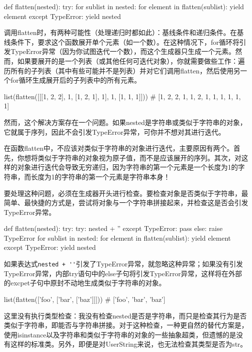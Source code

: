 \begin{pyc}
def flatten(nested):
    try:
        for sublist in nested:
            for element in flatten(sublist):
                yield element
    except TypeError:
        yield nested
\end{pyc}

调用flatten时，有两种可能性（处理递归时都如此）：基线条件和递归条件。在基线条件下，要求这个函数展开单个元素（如一个数）。在这种情况下，for循环将引发TypeError异常（因为你试图迭代一个数），而这个生成器只生成一个元素。然而，如果要展开的是一个列表（或其他任何可迭代对象），你就需要做些工作：遍历所有的子列表（其中有些可能并不是列表）并对它们调用flatten，然后使用另一个for循环生成展开后的子列表中的所有元素。
\begin{pyc}
list(flatten([[[1, 2, 2], 1, [1, 2, 1], 1], 1, [1, 1, 1]]))
# [1, 2, 2, 1, 1, 2, 1, 1, 1, 1, 1, 1]
\end{pyc}
然而，这个解决方案存在一个问题。如果nested是字符串或类似于字符串的对象，它就属于序列，因此不会引发TypeError异常，可你并不想对其进行迭代。
\begin{tcolorbox}
在函数flatten中，不应该对类似于字符串的对象进行迭代，主要原因有两个。首先，你想将类似于字符串的对象视为原子值，而不是应该展开的序列。其次，对这样的对象进行迭代会导致无穷递归，因为字符串的第一个元素是一个长度为1的字符串，而长度为1的字符串的第一个元素是字符串本身！
\end{tcolorbox}
要处理这种问题，必须在生成器开头进行检查。要检查对象是否类似于字符串，最简单、最快捷的方式是，尝试将对象与一个字符串拼接起来，并检查这是否会引发TypeError异常。

\begin{pyc}
def flatten(nested):
    try:
        try:
            nested + ''
        except TypeError:
            pass
        else:
            raise TypeError
        for sublist in nested:
            for element in flatten(sublist):
                yield element
    except TypeError:
        yield nested
\end{pyc}
如果表达式\verb|nested + ''|引发了TypeError异常，就忽略这种异常；如果没有引发TypeError异常，内部try语句中的else子句将引发TypeError异常，这样将在外部的excpet子句中原封不动地生成类似于字符串的对象。
\begin{pyc}
list(flatten(['foo', ['bar', ['baz']]]))
# ['foo', 'bar', 'baz']
\end{pyc}
这里没有执行类型检查：我没有检查nested是否是字符串，而只是检查其行为是否类似于字符串，即能否与字符串拼接。对于这种检查，一种更自然的替代方案是，使用isinstance以及字符串和类似于字符串的对象的一些抽象超类，但遗憾的是没有这样的标准类。另外，即便是对UserString来说，也无法检查其类型是否为str。

